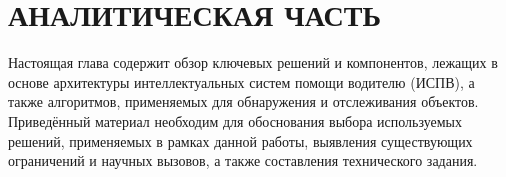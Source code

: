 \chapter{АНАЛИТИЧЕСКАЯ ЧАСТЬ}

Настоящая глава содержит обзор ключевых решений и компонентов, лежащих в основе архитектуры интеллектуальных систем помощи водителю (ИСПВ), а также алгоритмов, применяемых для обнаружения и отслеживания объектов. Приведённый материал необходим для обоснования выбора используемых решений, применяемых в рамках данной работы, выявления существующих ограничений и научных вызовов, а также составления технического задания.








